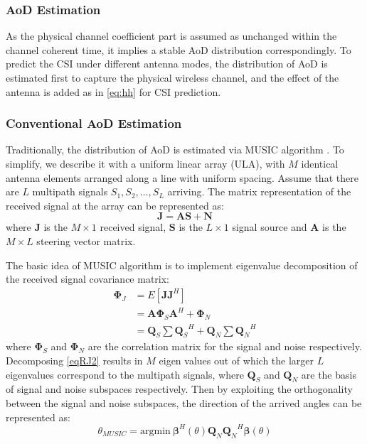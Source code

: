 \subsubsection{AoD Estimation}
As the physical channel coefficient part is assumed as unchanged within the channel coherent time, it implies a stable AoD distribution correspondingly. To predict the CSI under different antenna modes, the distribution of AoD is estimated first to capture the physical wireless channel, and the effect of the antenna is added as in \eqref{eq:hh} for CSI prediction.

\subsubsection{Conventional AoD Estimation}
Traditionally, the distribution of AoD is estimated via MUSIC algorithm \cite{schmidt1986multiple}. To simplify, we describe it with a uniform linear array (ULA), with $M$ identical antenna elements arranged along a line with uniform spacing. Assume that there are $L$ multipath signals $S_1,S_2,\dots,S_L$ arriving. The matrix representation of the received signal at the array can be represented as:
\begin{equation}
    \mathbf{J} = \mathbf{A}\mathbf{S} + \mathbf{N} \label{eqJ}
\end{equation}
where $\mathbf{J}$ is the $M \times 1$ received signal, $\mathbf{S}$ is the $L \times 1$ signal source and $\mathbf{A}$ is the $M \times L$ steering vector matrix.

The basic idea of MUSIC algorithm is to implement eigenvalue decomposition of the received signal covariance matrix:
\begin{align}
    \mathbf{\Phi}_J & = E[\mathbf{J}\mathbf{J}^H] \label{eqRJ} \\
           & = \mathbf{A}\mathbf{\Phi}_S\mathbf{A}^H+\mathbf{\Phi}_N \label{eqRJ2}\\
           & = \mathbf{Q}_S\sum {\mathbf{Q}_S}^H+\mathbf{Q}_N\sum {\mathbf{Q}_N}^H
\end{align}
where $\mathbf{\Phi}_S$ and $\mathbf{\Phi}_N$ are the correlation matrix for the signal and noise respectively. Decomposing \eqref{eqRJ2} results in $M$ eigen values out of which the larger $L$ eigenvalues correspond to the multipath signals, where $\mathbf{Q}_S$ and $\mathbf{Q}_N$ are the basis of signal and noise subspaces respectively. Then by exploiting the orthogonality between the signal and noise subspaces, the direction of the arrived angles can be represented as:
\begin{equation}
    \theta_{MUSIC} = \text{argmin}~ \boldsymbol{\beta}^H(\theta)\mathbf{Q}_N{\mathbf{Q}_N}^H\boldsymbol{\beta}(\theta)
\end{equation}

